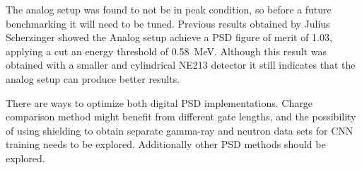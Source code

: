 \documentclass[main.tex]{subfiles}
\begin{document}
The analog setup was found to not be in peak condition, so before a future benchmarking it will need to be tuned. Previous results obtained by Julius Scherzinger showed the Analog setup achieve a PSD figure of merit of 1.03, applying a cut an energy threshold of \SI{0.58}{\MeV}\cite{ScherzingerPhd}. Although this result was obtained with a smaller and cylindrical NE213 detector it still indicates that the analog setup can produce better results.

There are ways to optimize both digital PSD implementations. Charge comparison method might benefit from different gate lengths, and the possibility of using shielding to obtain separate gamma-ray and neutron data sets for CNN training needs to be explored. Additionally other PSD methods should be explored.
\end{document}

